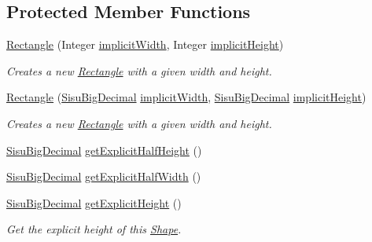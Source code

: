 \subsection*{Protected Member Functions}
\begin{DoxyCompactItemize}
\item 
\hyperlink{classcom_1_1aarrelaakso_1_1drawl_1_1_rectangle_a178c07a0610409258818f61ae332d85a}{Rectangle} (Integer \hyperlink{classcom_1_1aarrelaakso_1_1drawl_1_1_shape_a100066b3ccbb6e88080211b00ad8ebb9}{implicit\+Width}, Integer \hyperlink{classcom_1_1aarrelaakso_1_1drawl_1_1_shape_ab374c520d98692018b1a5866acd33849}{implicit\+Height})
\begin{DoxyCompactList}\small\item\em Creates a new \hyperlink{classcom_1_1aarrelaakso_1_1drawl_1_1_rectangle}{Rectangle} with a given width and height. \end{DoxyCompactList}\item 
\hyperlink{classcom_1_1aarrelaakso_1_1drawl_1_1_rectangle_aa5cd32bd84c1b9f0dd53757d2b4460f2}{Rectangle} (\hyperlink{classcom_1_1aarrelaakso_1_1drawl_1_1_sisu_big_decimal}{Sisu\+Big\+Decimal} \hyperlink{classcom_1_1aarrelaakso_1_1drawl_1_1_shape_a100066b3ccbb6e88080211b00ad8ebb9}{implicit\+Width}, \hyperlink{classcom_1_1aarrelaakso_1_1drawl_1_1_sisu_big_decimal}{Sisu\+Big\+Decimal} \hyperlink{classcom_1_1aarrelaakso_1_1drawl_1_1_shape_ab374c520d98692018b1a5866acd33849}{implicit\+Height})
\begin{DoxyCompactList}\small\item\em Creates a new \hyperlink{classcom_1_1aarrelaakso_1_1drawl_1_1_rectangle}{Rectangle} with a given width and height. \end{DoxyCompactList}\item 
\hyperlink{classcom_1_1aarrelaakso_1_1drawl_1_1_sisu_big_decimal}{Sisu\+Big\+Decimal} \hyperlink{classcom_1_1aarrelaakso_1_1drawl_1_1_shape_aa3857406bc4f6c7373f1cd7cbe16dfd9}{get\+Explicit\+Half\+Height} ()
\item 
\hyperlink{classcom_1_1aarrelaakso_1_1drawl_1_1_sisu_big_decimal}{Sisu\+Big\+Decimal} \hyperlink{classcom_1_1aarrelaakso_1_1drawl_1_1_shape_a4fba348eaeef3c258aa7443410137ad7}{get\+Explicit\+Half\+Width} ()
\item 
\hyperlink{classcom_1_1aarrelaakso_1_1drawl_1_1_sisu_big_decimal}{Sisu\+Big\+Decimal} \hyperlink{classcom_1_1aarrelaakso_1_1drawl_1_1_shape_a0a263872f3a0bd19822415420e132a07}{get\+Explicit\+Height} ()
\begin{DoxyCompactList}\small\item\em Get the explicit height of this \hyperlink{classcom_1_1aarrelaakso_1_1drawl_1_1_shape}{Shape}. \end{DoxyCompactList}\item 

\end{DoxyCompactItemize}
